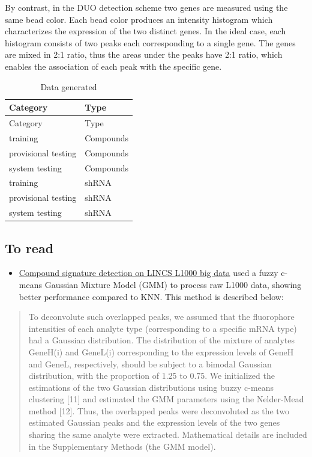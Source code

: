 \documentclass[]{article}
\providecommand{\tightlist}{%
  \setlength{\itemsep}{0pt}\setlength{\parskip}{0pt}}
\begin{document}
By contrast, in the DUO detection scheme two genes are measured using
the same bead color. Each bead color produces an intensity histogram
which characterizes the expression of the two distinct genes. In the
ideal case, each histogram consists of two peaks each corresponding to a
single gene. The genes are mixed in 2:1 ratio, thus the areas under the
peaks have 2:1 ratio, which enables the association of each peak with
the specific gene.

\begin{longtable}[]{@{}ll@{}}
\caption{Data generated}\tabularnewline
\toprule
Category & Type\tabularnewline
\midrule
\endfirsthead
\toprule
Category & Type\tabularnewline
\midrule
\endhead
training & Compounds\tabularnewline
provisional testing & Compounds\tabularnewline
system testing & Compounds\tabularnewline
training & shRNA\tabularnewline
provisional testing & shRNA\tabularnewline
system testing & shRNA\tabularnewline
\bottomrule
\end{longtable}

\hypertarget{to-read-1}{%
\subsection{To read}\label{to-read-1}}

\begin{itemize}
\tightlist
\item
  \href{https://pubs.rsc.org/en/content/getauthorversionpdf/c4mb00677a}{Compound
  signature detection on LINCS L1000 big data} used a fuzzy c-means
  Gaussian Mixture Model (GMM) to process raw L1000 data, showing better
  performance compared to KNN. This method is described below:
\end{itemize}

\begin{quote}
To deconvolute such overlapped peaks, we assumed that the fluorophore
intensities of each analyte type (corresponding to a specific mRNA type)
had a Gaussian distribution. The distribution of the mixture of analytes
GeneH(i) and GeneL(i) corresponding to the expression levels of GeneH
and GeneL, respectively, should be subject to a bimodal Gaussian
distribution, with the proportion of 1.25 to 0.75. We initialized the
estimations of the two Gaussian distributions using buzzy c-means
clustering {[}11{]} and estimated the GMM parameters using the
Nelder-Mead method {[}12{]}. Thus, the overlapped peaks were
deconvoluted as the two estimated Gaussian peaks and the expression
levels of the two genes sharing the same analyte were extracted.
Mathematical details are included in the Supplementary Methods (the GMM
model).
\end{quote}
\end{document}
